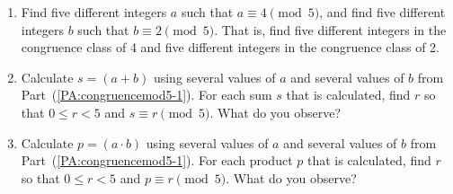 \begin{previewactivity} \label{PA:congruencemod5} \hfill
\begin{enumerate}
\item Find five different integers  $a$  such that  $a \equiv 4 \pmod 5$, and find five different integers  $b$  such that  $b \equiv 2 \pmod 5$.  That is, find five different integers in the congruence class of  4 and five different integers in the congruence class of 2.\label{PA:congruencemod5-1}


\item Calculate  $s = \left( {a + b} \right)$ using several values of  $a$  
and several values of  $b$  from 
Part~(\ref{PA:congruencemod5-1}).  For each sum $s$ that is calculated, find  $r$  so that  $0 \leq r < 5$ and  $s \equiv r \pmod 5$.  \label{PA:congruencemod5-3}  What do you observe?

\item Calculate  $p = \left( {a \cdot b} \right)$ using several values of  $a$  and several values of  $b$  from 
Part~(\ref{PA:congruencemod5-1}).  For each product $p$ that is calculated, find  $r$  so that  
$0 \leq r < 5$ and  $p \equiv r \pmod 5$.  \label{PA:congruencemod5-4} What do you observe?
\end{enumerate}
\end{previewactivity}
\hbreak
%
